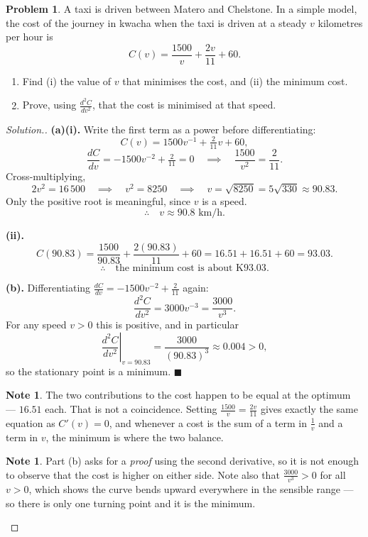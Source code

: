 \documentclass[11pt,a4paper]{article}
\theoremstyle{definition}
\newtheorem{note}[thm]{Note}
\newtheorem{problemx}{Problem}[section]
\newenvironment{problem}{\begin{problemx}}{\end{problemx}}
\newenvironment{solution}
  {\renewcommand{\qedsymbol}{}\begin{proof}[\textit{Solution}.]}
  {\end{proof}}
\begin{document}
\begin{problem}
A taxi is driven between Matero and Chelstone. In a simple model, the cost of the
journey in kwacha when the taxi is driven at a steady $v$ kilometres per hour is
$$C(v)=\frac{1500}{v}+\frac{2v}{11}+60.$$
\begin{enumerate}
\item[(a).] Find (i) the value of $v$ that minimises the cost, and (ii) the minimum
cost.
\item[(b).] Prove, using $\frac{d^2C}{dv^2}$, that the cost is minimised at that speed.
\end{enumerate}
\end{problem}

\begin{solution}
\textbf{(a)(i).} Write the first term as a power before differentiating:
$$C(v)=1500v^{-1}+\tfrac{2}{11}v+60,$$
$$\frac{dC}{dv}=-1500v^{-2}+\tfrac{2}{11}=0\quad\implies\quad
\frac{1500}{v^2}=\frac{2}{11}.$$
Cross-multiplying,
$$2v^2=16\,500\quad\implies\quad v^2=8250\quad\implies\quad
v=\sqrt{8250}=5\sqrt{330}\approx 90.83.$$
Only the positive root is meaningful, since $v$ is a speed.
$$\therefore\quad v\approx 90.8\text{ km/h}.$$

\textbf{(ii).}
$$C(90.83)=\frac{1500}{90.83}+\frac{2(90.83)}{11}+60=16.51+16.51+60=93.03.$$
$$\therefore\quad \text{the minimum cost is about K}93.03.$$

\textbf{(b).} Differentiating $\frac{dC}{dv}=-1500v^{-2}+\frac{2}{11}$ again:
$$\frac{d^2C}{dv^2}=3000v^{-3}=\frac{3000}{v^3}.$$
For any speed $v>0$ this is positive, and in particular
$$\left.\frac{d^2C}{dv^2}\right|_{v=90.83}=\frac{3000}{(90.83)^3}\approx 0.004>0,$$
so the stationary point is a minimum. $\blacksquare$

\begin{note}
The two contributions to the cost happen to be equal at the optimum --- $16.51$ each.
That is not a coincidence. Setting $\frac{1500}{v}=\frac{2v}{11}$ gives exactly the same
equation as $C'(v)=0$, and whenever a cost is the sum of a term in $\frac{1}{v}$ and a
term in $v$, the minimum is where the two balance.
\end{note}

\begin{note}
Part (b) asks for a \emph{proof} using the second derivative, so it is not enough to
observe that the cost is higher on either side. Note also that $\frac{3000}{v^3}>0$ for
all $v>0$, which shows the curve bends upward everywhere in the sensible range --- so
there is only one turning point and it is the minimum.
\end{note}
\end{solution}
\end{document}
